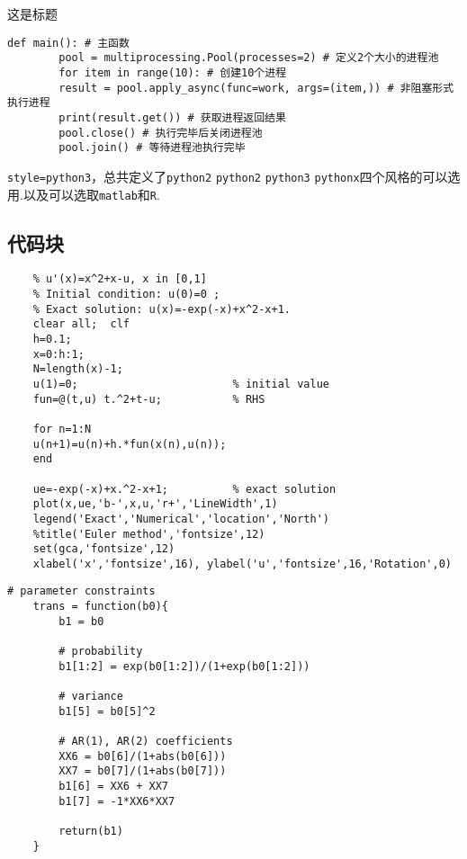 \documentclass[a4]{ctexart}
\begin{document}
\begin{macboxd}{这是标题}
	\begin{lstlisting}[style=python3]
		def main(): # 主函数
		pool = multiprocessing.Pool(processes=2) # 定义2个大小的进程池
		for item in range(10): # 创建10个进程
		result = pool.apply_async(func=work, args=(item,)) # 非阻塞形式执行进程
		print(result.get()) # 获取进程返回结果
		pool.close() # 执行完毕后关闭进程池
		pool.join() # 等待进程池执行完毕
	\end{lstlisting}
\end{macboxd}
\verb*|style=python3|，总共定义了\verb*|python2| \verb*|python2| \verb*|python3| \verb*|pythonx|四个风格的可以选用.以及可以选取\verb*|matlab|和\verb*|R|.
\subsection{代码块}

\begin{lstlisting}[style=matlab,title={MATLAB code}]
	% Euler method for the ODE model
	% u'(x)=x^2+x-u, x in [0,1]
	% Initial condition: u(0)=0 ;
	% Exact solution: u(x)=-exp(-x)+x^2-x+1.
	clear all;  clf
	h=0.1;
	x=0:h:1;
	N=length(x)-1;
	u(1)=0;                        % initial value
	fun=@(t,u) t.^2+t-u;           % RHS
	
	for n=1:N
	u(n+1)=u(n)+h.*fun(x(n),u(n));
	end
	
	ue=-exp(-x)+x.^2-x+1;          % exact solution
	plot(x,ue,'b-',x,u,'r+','LineWidth',1)
	legend('Exact','Numerical','location','North')
	%title('Euler method','fontsize',12)
	set(gca,'fontsize',12)
	xlabel('x','fontsize',16), ylabel('u','fontsize',16,'Rotation',0)
\end{lstlisting}


\begin{lstlisting}[style=R,title={R code}]
	# parameter constraints
	trans = function(b0){
		b1 = b0
		
		# probability
		b1[1:2] = exp(b0[1:2])/(1+exp(b0[1:2]))
		
		# variance
		b1[5] = b0[5]^2
		
		# AR(1), AR(2) coefficients
		XX6 = b0[6]/(1+abs(b0[6]))
		XX7 = b0[7]/(1+abs(b0[7]))
		b1[6] = XX6 + XX7
		b1[7] = -1*XX6*XX7
		
		return(b1)
	}
\end{lstlisting}
\end{document}
